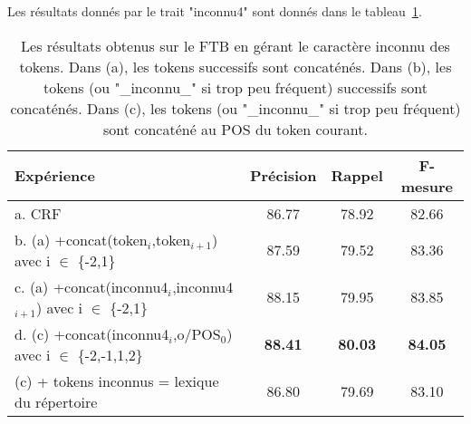 \documentclass[citation\_needed]{subfiles}
\begin{document}
Les résultats donnés par le trait "inconnu4" sont donnés dans le tableau\ \ref{tab:results-ftb-word-bigrams}.

\begin{table}[ht!]
\centering
\begin{tabular}{|l|ccc|}
\hline
Expérience   & Précision & Rappel & F-mesure \\
\hline
a. CRF                                                             & 86.77 & 78.92 & 82.66 \\
b. (a) +concat(token$_{i}$,token$_{i+1}$) avec i $\in$ \{-2,1\}        & 87.59 & 79.52 & 83.36 \\
c. (a) +concat(inconnu4$_{i}$,inconnu4$_{i+1}$) avec i $\in$ \{-2,1\}    & 88.15 & 79.95 & 83.85 \\
d. (c) +concat(inconnu4$_{i}$,o/POS$_{0}$) avec i $\in$ \{-2,-1,1,2\} & \textbf{88.41} & \textbf{80.03} & \textbf{84.05} \\
\hline
(c) + tokens inconnus = lexique du répertoire & 86.80 & 79.69 & 83.10 \\
\hline
\end{tabular}
\caption{Les résultats obtenus sur le FTB en gérant le caractère inconnu des tokens. Dans (a), les tokens successifs sont concaténés. Dans (b), les tokens (ou "\_inconnu\_" si trop peu fréquent) successifs sont concaténés. Dans (c), les tokens (ou "\_inconnu\_" si trop peu fréquent) sont concaténé au POS du token courant.}
\label{tab:results-ftb-word-bigrams}
\end{table}
\end{document}
